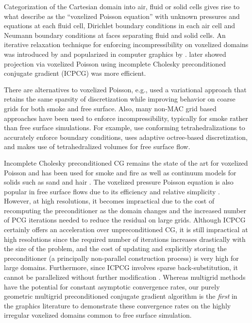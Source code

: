 Categorization of the Cartesian domain into air,
fluid or solid cells gives rise to what \cite{BBB07} describe as the ``voxelized Poisson equation'' with unknown pressures and equations at each fluid cell, Dirichlet boundary conditions
in each air cell and Neumann boundary conditions at faces separating
fluid and solid cells. An iterative relaxation technique for enforcing
incompressibility on voxelized domains was introduced by
\cite{nichols:1972:freesurface} and 
popularized in computer graphics by
\cite{Foster:1996:RAO}. \cite{FF01} later showed projection via
voxelized Poisson using incomplete Cholesky preconditioned conjugate
gradient (ICPCG) was more efficient. 


There are alternatives to voxelized Poisson, e.g., \cite{BBB07} used a variational approach that retains the same sparsity of discretization while improving behavior on coarse grids for both smoke and free surface. Also, many non-MAC grid based approaches have been used to enforce incompressibility, typically for smoke rather than free surface simulations. For example, \cite{MCPTD09,KFCO06,FOK05,ETKSD07} use conforming tetrahedralizations to accurately enforce boundary conditions, \cite{LGF04} uses adaptive octree-based discretization, and \cite{CNF07} makes use of tetrahedralized volumes for free surface flow.

Incomplete Cholesky preconditioned CG remains the state of the art for
voxelized Poisson and has been used for smoke \cite{SRF05,MTPS04,FSJ01} and fire \cite{HG09} as well as continuum models for solids such as sand \cite{zhu:2005:sand} and hair \cite{mcadams:2009:hair}. The voxelized pressure Poisson equation is also popular in free surface flows due to its efficiency and relative simplicity
\cite{CMT04,FF01,GBO04,HK05,HLYK08,KC07,MTPS04,NNSM08,WMT05,zhu:2005:sand}.  However, at high resolutions, it becomes impractical due to the cost of recomputing the preconditioner as the domain changes and the increased number of PCG iterations needed to reduce the residual on large grids.  
Although ICPCG certainly offers an acceleration over unpreconditioned CG, it is still impractical at high resolutions since the required number of iterations increases drastically with the size of the problem, and the cost of updating and explicitly storing the preconditioner (a principally non-parallel construction process) 
is very high for large domains.  Furthermore, since ICPCG involves sparse back-substitution, it cannot be parallelized without further modification \cite{Hughes:2007:physicalsimulation}.
Whereas multigrid methods have the potential for constant asymptotic convergence rates, our purely geometric multigrid preconditioned conjugate gradient algorithm is the \emph{first} in the graphics literature to demonstrate these convergence rates on the highly irregular voxelized domains common to free surface simulation.

